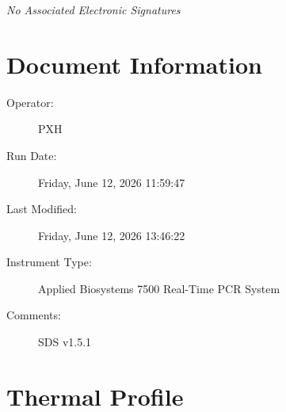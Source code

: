 \documentclass[UTF8,10pt,a4paper,fontset=fandol]{ctexart}
\newcommand{\fieldvalue}[1]{#1}
\begin{document}
\textit{No Associated Electronic Signatures}

\section*{Document Information}

\begin{description}
\item[Operator:] %
\fieldvalue{PXH}

\item[Run Date:] %
\fieldvalue{Friday, June 12, 2026 11:59:47}

\item[Last Modified:] %
\fieldvalue{Friday, June 12, 2026 13:46:22}

\item[Instrument Type:] %
\fieldvalue{Applied Biosystems 7500 Real-Time PCR System}

\item[Comments:] %
\fieldvalue{SDS v1.5.1}
\end{description}

\section*{Thermal Profile}
\end{document}
